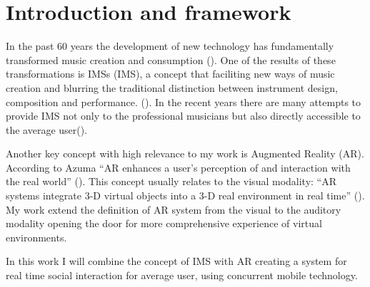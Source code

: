\section{Introduction and framework}


In the past 60 years the development of new technology has fundamentally transformed music creation and consumption (\cite[]{winkler01}).
One of the results of these transformations is IMSs (IMS), a concept that faciliting new ways of music creation and blurring the traditional distinction between instrument design, composition and performance. (\cite{drummond09}).
In the recent years there are many attempts to provide IMS not only to the professional musicians but also directly accessible to the average user().

Another key concept with high relevance to my work is Augmented Reality (AR).
According to Azuma ``AR enhances a user's perception of and interaction with the real world'' (\cite*{azuma97}). This concept usually relates to the visual modality: ``AR systems integrate 3-D virtual objects into a 3-D real environment in real time'' (\cite{azuma97}). My work extend the definition of AR system from the visual to the auditory modality opening the door for more comprehensive experience of virtual environments.

In this work I will combine the concept of IMS with AR creating a system for real time social interaction for average user, using concurrent mobile technology.
